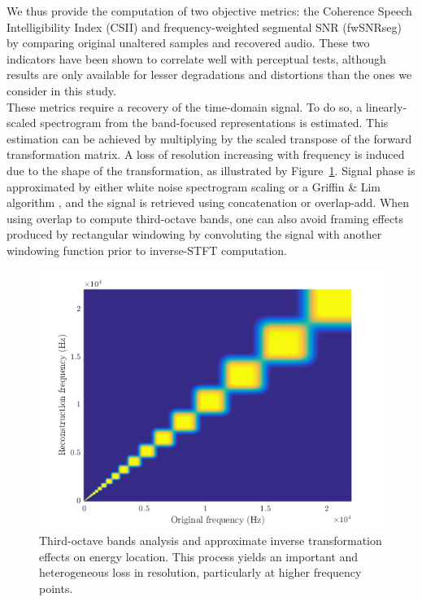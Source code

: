 \documentclass[final,3p,times,twocolumn]{elsarticle}
\begin{document}

We thus provide the computation of two objective metrics: the Coherence Speech Intelligibility Index\cite{kates2005} (CSII) and frequency-weighted segmental SNR\cite{hu2008} (fwSNRseg) by comparing original unaltered samples and recovered audio. These two indicators have been shown to correlate well with perceptual tests\cite{ma2009}, although results are only available for lesser degradations and distortions than the ones we consider in this study.\\

These metrics require a recovery of the time-domain signal. To do so, a linearly-scaled spectrogram from the band-focused representations is estimated. This estimation can be achieved by multiplying by the scaled transpose of the forward transformation matrix. A loss of resolution increasing with frequency is induced due to the shape of the transformation, as illustrated by Figure~\ref{fig:freq}. Signal phase is approximated by either white noise spectrogram scaling or a Griffin \& Lim algorithm \cite{griffin1984}, and the signal is retrieved using concatenation or overlap-add. When using overlap to compute third-octave bands, one can also avoid framing effects produced by rectangular windowing by convoluting the signal with another windowing function prior to inverse-STFT computation.\\

\begin{figure}[htbp]
	\centering
		\includegraphics[width=\columnwidth]{freq.png}
	\caption{Third-octave bands analysis and approximate inverse transformation effects on energy location. This process yields an important and heterogeneous loss in resolution, particularly at higher frequency points.}
	\label{fig:freq}
\end{figure}
\end{document}
